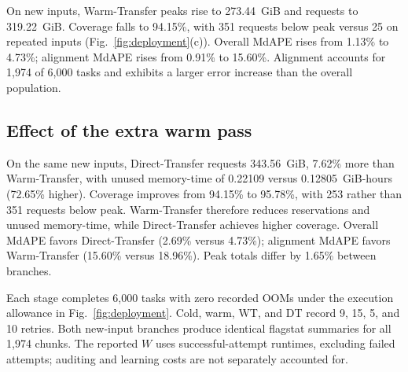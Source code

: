 On new inputs, Warm-Transfer peaks rise to 273.44~GiB and requests to
319.22~GiB. Coverage falls to 94.15\%, with 351 requests below peak
versus 25 on repeated inputs (Fig.~\ref{fig:deployment}(c)). Overall
MdAPE rises from 1.13\% to 4.73\%; alignment MdAPE rises from 0.91\%
to 15.60\%. Alignment accounts for 1,974 of 6,000 tasks and exhibits
a larger error increase than the overall population.

\subsection{Effect of the extra warm pass}
On the same new inputs, Direct-Transfer requests 343.56~GiB, 7.62\%
more than Warm-Transfer, with unused memory-time of 0.22109 versus
0.12805~GiB-hours (72.65\% higher). Coverage improves from 94.15\%
to 95.78\%, with 253 rather than 351 requests below peak.
Warm-Transfer therefore reduces reservations and unused memory-time,
while Direct-Transfer achieves higher coverage.
Overall MdAPE favors Direct-Transfer (2.69\% versus 4.73\%);
alignment MdAPE favors Warm-Transfer (15.60\% versus 18.96\%).
Peak totals differ by 1.65\% between branches.

Each stage completes 6,000 tasks with zero recorded OOMs under the
execution allowance in Fig.~\ref{fig:deployment}. Cold, warm, WT, and
DT record 9, 15, 5, and 10 retries. Both new-input branches produce
identical flagstat summaries for all 1,974 chunks. The reported $W$
uses successful-attempt runtimes, excluding failed attempts; auditing
and learning costs are not separately accounted for.
